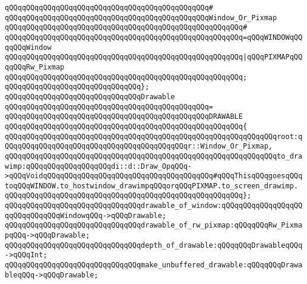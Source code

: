 \verb|qQQqqQQqqQQqqQQqqQQqqQQqqQQqqQQqqQQqqQQqqQQqqQQq#|\newline
\verb|qQQqqQQqqQQqqQQqqQQqqQQqqQQqqQQqqQQqqQQqqQQqqQQqWindow_Or_Pixmap|\newline
\verb|qQQqqQQqqQQqqQQqqQQqqQQqqQQqqQQqqQQqqQQqqQQqqQQqqQQqqQQq#|\newline
\verb|qQQqqQQqqQQqqQQqqQQqqQQqqQQqqQQqqQQqqQQqqQQqqQQqqQQqqQQq=qQQqWINDOWqQQqqQQqWindow|\newline
\verb|qQQqqQQqqQQqqQQqqQQqqQQqqQQqqQQqqQQqqQQqqQQqqQQqqQQqqQQq|\verb#|qQQqPIXMAPqQQqqQQqRw_Pixmap#\newline
\verb|qQQqqQQqqQQqqQQqqQQqqQQqqQQqqQQqqQQqqQQqqQQqqQQqqQQqqQQq;|\newline
\verb|qQQqqQQqqQQqqQQqqQQqqQQqqQQqqQQq};|\newline
\newline
\verb|qQQqqQQqqQQqqQQqqQQqqQQqqQQqqQQqDrawable|\newline
\verb|qQQqqQQqqQQqqQQqqQQqqQQqqQQqqQQqqQQqqQQqqQQqqQQq=|\newline
\verb|qQQqqQQqqQQqqQQqqQQqqQQqqQQqqQQqqQQqqQQqqQQqqQQqDRAWABLE|\newline
\verb|qQQqqQQqqQQqqQQqqQQqqQQqqQQqqQQqqQQqqQQqqQQqqQQqqQQqqQQq{|\newline
\verb|qQQqqQQqqQQqqQQqqQQqqQQqqQQqqQQqqQQqqQQqqQQqqQQqqQQqqQQqqQQqqQQqroot:qQQqqQQqqQQqqQQqqQQqqQQqqQQqqQQqqQQqqQQqqQQqr::Window_Or_Pixmap,|\newline
\verb|qQQqqQQqqQQqqQQqqQQqqQQqqQQqqQQqqQQqqQQqqQQqqQQqqQQqqQQqqQQqqQQqto_drawimp:qQQqqQQqqQQqqQQqqQQqdi::d::Draw_OpqQQq->qQQqVoidqQQqqQQqqQQqqQQqqQQqqQQqqQQqqQQqqQQqqQQq#qQQqThisqQQqgoesqQQqtoqQQqWINDOW.to_hostwindow_drawimpqQQqorqQQqPIXMAP.to_screen_drawimp.|\newline
\verb|qQQqqQQqqQQqqQQqqQQqqQQqqQQqqQQqqQQqqQQqqQQqqQQqqQQqqQQq};|\newline
\newline
\verb|qQQqqQQqqQQqqQQqqQQqqQQqqQQqqQQqdrawable_of_window:qQQqqQQqqQQqqQQqqQQqqQQqqQQqqQQqWindowqQQq->qQQqDrawable;|\newline
\verb|qQQqqQQqqQQqqQQqqQQqqQQqqQQqqQQqdrawable_of_rw_pixmap:qQQqqQQqRw_PixmapqQQq->qQQqDrawable;|\newline
\newline
\verb|qQQqqQQqqQQqqQQqqQQqqQQqqQQqqQQqdepth_of_drawable:qQQqqQQqDrawableqQQq->qQQqInt;|\newline
\newline
\verb|qQQqqQQqqQQqqQQqqQQqqQQqqQQqqQQqmake_unbuffered_drawable:qQQqqQQqDrawableqQQq->qQQqDrawable;|\newline
